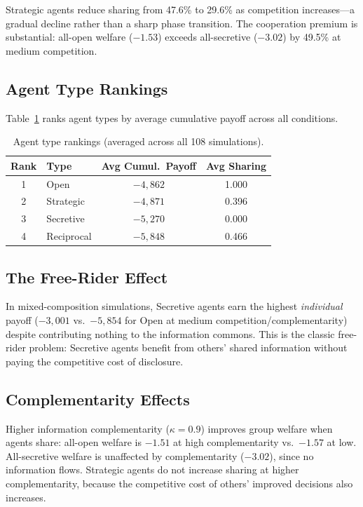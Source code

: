 \documentclass[11pt]{article}
\begin{document}
Strategic agents reduce sharing from 47.6\% to 29.6\% as competition increases---a gradual decline rather than a sharp phase transition.
The cooperation premium is substantial: all-open welfare ($-1.53$) exceeds all-secretive ($-3.02$) by 49.5\% at medium competition.

\subsection{Agent Type Rankings}

Table~\ref{tab:rankings} ranks agent types by average cumulative payoff across all conditions.

\begin{table}[h]
\centering
\small
\caption{Agent type rankings (averaged across all 108 simulations).}
\label{tab:rankings}
\begin{tabular}{clcc}
\toprule
\textbf{Rank} & \textbf{Type} & \textbf{Avg Cumul.\ Payoff} & \textbf{Avg Sharing} \\
\midrule
1 & Open & $-4{,}862$ & 1.000 \\
2 & Strategic & $-4{,}871$ & 0.396 \\
3 & Secretive & $-5{,}270$ & 0.000 \\
4 & Reciprocal & $-5{,}848$ & 0.466 \\
\bottomrule
\end{tabular}
\end{table}

\subsection{The Free-Rider Effect}

In mixed-composition simulations, Secretive agents earn the highest \emph{individual} payoff ($-3{,}001$ vs.\ $-5{,}854$ for Open at medium competition/complementarity) despite contributing nothing to the information commons.
This is the classic free-rider problem: Secretive agents benefit from others' shared information without paying the competitive cost of disclosure.

\subsection{Complementarity Effects}

Higher information complementarity ($\kappa{=}0.9$) improves group welfare when agents share: all-open welfare is $-1.51$ at high complementarity vs.\ $-1.57$ at low.
All-secretive welfare is unaffected by complementarity ($-3.02$), since no information flows.
Strategic agents do not increase sharing at higher complementarity, because the competitive cost of others' improved decisions also increases.
\end{document}
